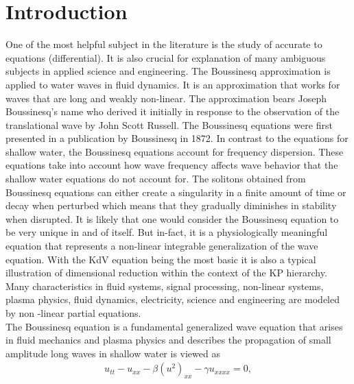 \documentclass[10pt]{NSP1}
\numberwithin{equation}{section}
\begin{document}

\maketitle

\section{Introduction}
\noindent One of the most helpful subject in the literature is the study of accurate  to equations (differential). It is also crucial for explanation of many ambiguous subjects in applied science and engineering. The Boussinesq approximation is applied to water waves in fluid dynamics. It is an approximation that works for waves that are long and weakly non-linear. The approximation bears Joseph Boussinesq's name who derived it initially in response to the observation of the translational wave by  John Scott Russell. The Boussinesq equations were first presented in a publication by Boussinesq in 1872. In contrast to the equations for shallow water, the Boussinesq equations account for frequency dispersion. These equations take into account how wave frequency affects wave behavior that the shallow water equations do not account for. The solitons obtained from Boussinesq equations can either create a singularity in a finite amount of time or decay when perturbed which means that they gradually diminishes in stability when disrupted. It is likely that one would consider the Boussinesq equation to be very unique in and of itself. But in-fact, it is a physiologically meaningful equation that represents a non-linear integrable generalization of the wave equation. With the KdV equation being the most basic it is also a typical illustration of dimensional reduction within the context of the KP hierarchy. Many characteristics in fluid systems, signal processing, non-linear systems, plasma physics, fluid dynamics, electricity, science and engineering are modeled by non -linear partial equations.\\
The Boussinesq equation is a fundamental generalized wave equation that arises in fluid mechanics and plasma physics and describes the propagation of small amplitude long waves in shallow water is viewed as
\begin{eqnarray}
u_{tt}-u_{xx}-\beta(u^2)_{xx}-\gamma u_{xxxx}=0,
\end{eqnarray}
\end{document}
